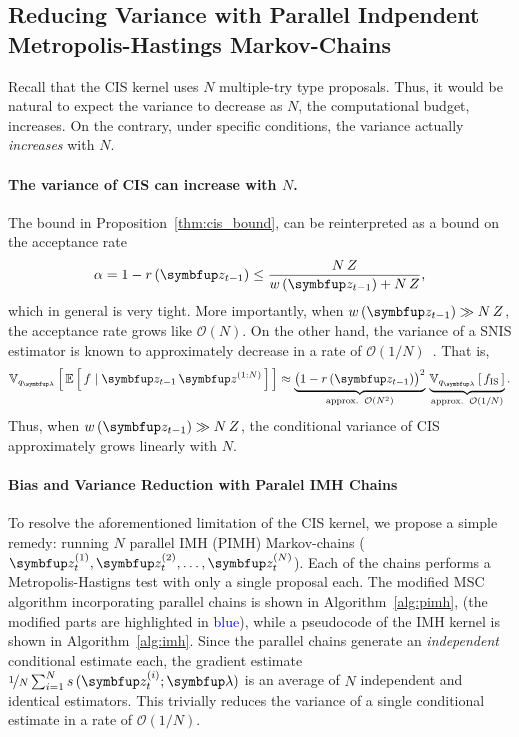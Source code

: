 \subsection{Reducing Variance with Parallel Indpendent Metropolis-Hastings Markov-Chains}\label{section:cis_bias}
Recall that the CIS kernel uses \(N\) multiple-try type proposals.
Thus, it would be natural to expect the variance to decrease as \(N\), the computational budget, increases.
On the contrary, under specific conditions, the variance actually \textit{increases} with \(N\).

\paragraph{The variance of CIS can increase with \(N\).}
The bound in Proposition~\ref{thm:cis_bound}, can be reinterpreted as a bound on the acceptance rate 
\begin{align}
  \alpha = 1 - r\,(\vz_{t-1}) \leq \frac{N\,Z}{ w\,(\vz_{t-1}) + N\,Z},
\end{align}
which in general is very tight.
More importantly, when \(w\,(\vz_{t-1}) \gg N\,Z\), the acceptance rate grows like \(\mathcal{O}(N)\).
On the other hand, the variance of a SNIS estimator is known to approximately decrease in a rate of \(\mathcal{O}(1/N)\)~\citep{kong_sequential_1994, robert_monte_2004, elvira_rethinking_2018}.
That is, 
\begin{align}
  \Vsub{q_{\vlambda}}{ \E{ f \mid \vz_{t-1}\,\vz^{(1:N)} } } \approx \underbrace{{\big(1 - r\,(\vz_{t-1})\big)}^2}_{\text{approx.}\;\;\mathcal{O}(N^2)} \,
  \underbrace{\Vsub{q_{\vlambda}}{ f_{\text{IS}} }}_{\text{approx.}\;\;\mathcal{O}(1/N)}.
\end{align}
Thus, when \(w\,(\vz_{t-1})\gg N\,Z\), the conditional variance of CIS approximately grows linearly with \(N\).

\paragraph{Bias and Variance Reduction with Paralel IMH Chains}
To resolve the aforementioned limitation of the CIS kernel, we propose a simple remedy: running \(N\) parallel IMH (PIMH) Markov-chains (\(\vz_t^{(1)}, \vz_t^{(2)}, \ldots, \vz_t^{(N)}\)).
Each of the chains performs a Metropolis-Hastigns test with only a single proposal each.
The modified MSC algorithm incorporating parallel chains is shown in Algorithm~\ref{alg:pimh}, (the modified parts are highlighted in \textcolor{blue}{blue}), while a pseudocode of the IMH kernel is shown in Algorithm~\ref{alg:imh}.
Since the parallel chains generate an \textit{independent} conditional estimate each, the gradient estimate \(\nicefrac{1}{N} \sum^{N}_{i=1} s\,(\vz_t^{(i)}; \vlambda)\) is an average of \(N\) independent and identical estimators.
This trivially reduces the variance of a single conditional estimate in a rate of \(\mathcal{O}(1/N)\).
%
%

